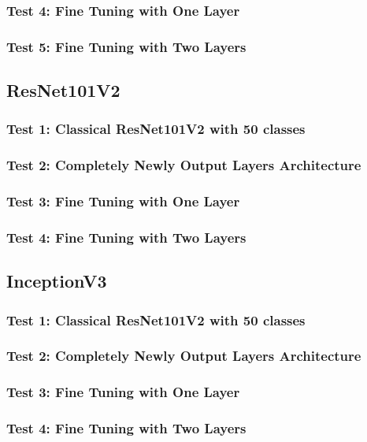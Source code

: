 \subsubsection{Test 4: Fine Tuning with One Layer}

\subsubsection{Test 5: Fine Tuning with Two Layers}







\subsection{ResNet101V2}

\subsubsection{Test 1: Classical ResNet101V2 with 50 classes}

\subsubsection{Test 2: Completely Newly Output Layers Architecture}

\subsubsection{Test 3: Fine Tuning with One Layer}

\subsubsection{Test 4: Fine Tuning with Two Layers}







\subsection{InceptionV3}

\subsubsection{Test 1: Classical ResNet101V2 with 50 classes}

\subsubsection{Test 2: Completely Newly Output Layers Architecture}

\subsubsection{Test 3: Fine Tuning with One Layer}

\subsubsection{Test 4: Fine Tuning with Two Layers}
